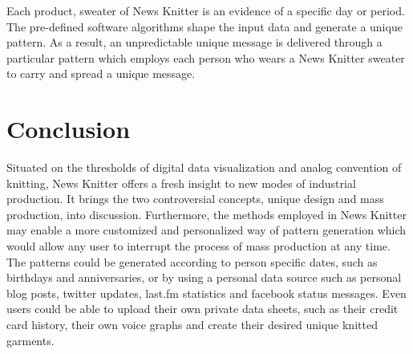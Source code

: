 \documentclass{acmsiggraph}                     %
\begin{document}
Each product, sweater of News Knitter is an evidence of a specific day or period. The pre-defined software algorithms shape the input data and generate a unique pattern. As a result, an unpredictable unique message is delivered through a particular pattern which employs each person who wears a News Knitter sweater to carry and spread a unique message.

\section{Conclusion}

Situated on the thresholds of digital data visualization and analog convention of knitting, News Knitter offers a fresh insight to new modes of industrial production. It brings the two controversial concepts, unique design and mass production, into discussion. Furthermore, the methods employed in News Knitter may enable a more customized and personalized way of pattern generation which would allow any user to interrupt the process of mass production at any time. The patterns could be generated according to person specific dates, such as birthdays and anniversaries, or by using a personal data source such as personal blog posts, twitter updates, last.fm statistics and facebook status messages. Even users could be able to upload their own private data sheets, such as their credit card history, their own voice graphs and create their desired unique knitted garments. 



\nocite{*}

\end{document}
